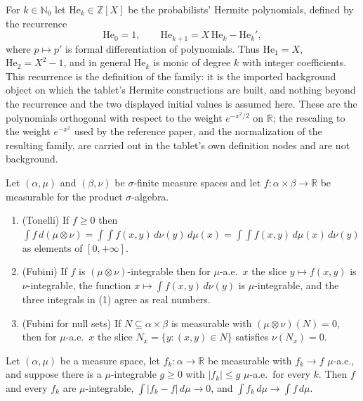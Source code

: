 \begin{definition}
For $k \in \mathbb{N}_0$ let $\mathrm{He}_k \in \mathbb{Z}[X]$ be the
probabilists' Hermite polynomials, defined by the recurrence
\[
  \mathrm{He}_0 = 1,
  \qquad
  \mathrm{He}_{k+1} = X\,\mathrm{He}_k - \mathrm{He}_k' ,
\]
where $p \mapsto p'$ is formal differentiation of polynomials.  Thus
$\mathrm{He}_1 = X$, $\mathrm{He}_2 = X^2 - 1$, and in general $\mathrm{He}_k$ is
monic of degree $k$ with integer coefficients.  This recurrence is the
definition of the family: it is the imported background object on which the
tablet's Hermite constructions are built, and nothing beyond the recurrence and
the two displayed initial values is assumed here.  These are the polynomials
orthogonal with respect to the weight $e^{-x^2/2}$ on $\mathbb{R}$; the
rescaling to the weight $e^{-x^2}$ used by the reference paper, and the
normalization of the resulting family, are carried out in the tablet's own
definition nodes and are not background.
\end{definition}
\begin{proposition}
Let $(\alpha,\mu)$ and $(\beta,\nu)$ be $\sigma$-finite measure spaces and let
$f : \alpha \times \beta \to \mathbb{R}$ be measurable for the product
$\sigma$-algebra.
\begin{enumerate}
\item (Tonelli) If $f \geq 0$ then
$\int f \, d(\mu\otimes\nu) = \int\!\!\int f(x,y)\, d\nu(y)\, d\mu(x)
 = \int\!\!\int f(x,y)\, d\mu(x)\, d\nu(y)$ as elements of $[0,+\infty]$.
\item (Fubini) If $f$ is $(\mu\otimes\nu)$-integrable then for $\mu$-a.e.\ $x$
the slice $y \mapsto f(x,y)$ is $\nu$-integrable, the function
$x \mapsto \int f(x,y)\,d\nu(y)$ is $\mu$-integrable, and the three integrals in
(1) agree as real numbers.
\item (Fubini for null sets) If $N \subseteq \alpha\times\beta$ is measurable
with $(\mu\otimes\nu)(N) = 0$, then for $\mu$-a.e.\ $x$ the slice
$N_x = \{y : (x,y) \in N\}$ satisfies $\nu(N_x) = 0$.
\end{enumerate}
\end{proposition}
\begin{proposition}
Let $(\alpha,\mu)$ be a measure space, let $f_k : \alpha \to \mathbb{R}$ be
measurable with $f_k \to f$ $\mu$-a.e., and suppose there is a $\mu$-integrable
$g \geq 0$ with $|f_k| \leq g$ $\mu$-a.e.\ for every $k$.  Then $f$ and every
$f_k$ are $\mu$-integrable, $\int |f_k - f| \, d\mu \to 0$, and
$\int f_k \, d\mu \to \int f \, d\mu$.
\end{proposition}
